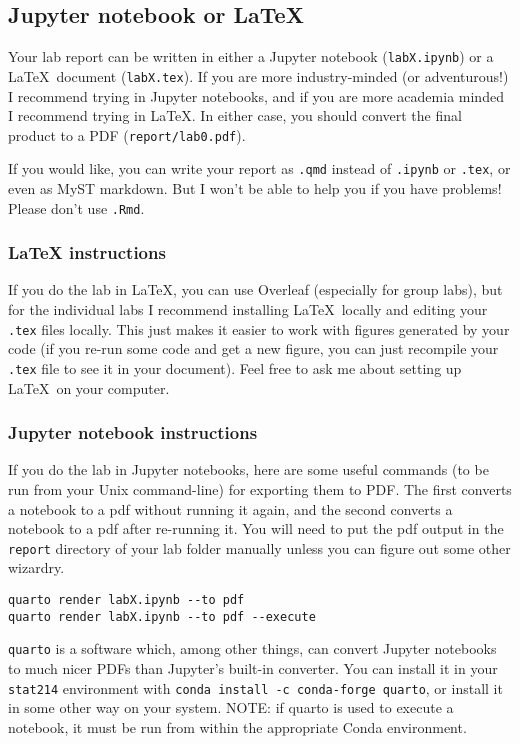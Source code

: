 \documentclass[letterpaper,12pt]{article}
\begin{document}

\subsection{Jupyter notebook or LaTeX}

Your lab report can be written in either a Jupyter notebook (\texttt{labX.ipynb}) or a \LaTeX\ document (\texttt{labX.tex}). If you are more industry-minded (or adventurous!) I recommend trying in Jupyter notebooks, and if you are more academia minded I recommend trying in \LaTeX. In either case, you should convert the final product to a PDF (\texttt{report/lab0.pdf}).

If you would like, you can write your report as \texttt{.qmd} instead of \texttt{.ipynb} or \texttt{.tex}, or even as MyST markdown. But I won't be able to help you if you have problems! Please don't use \texttt{.Rmd}.

\subsubsection{LaTeX instructions}
If you do the lab in \LaTeX, you can use Overleaf (especially for group labs), but for the individual labs I recommend installing \LaTeX\ locally and editing your \texttt{.tex} files locally. This just makes it easier to work with figures generated by your code (if you re-run some code and get a new figure, you can just recompile your \texttt{.tex} file to see it in your document). Feel free to ask me about setting up \LaTeX\ on your computer.

\subsubsection{Jupyter notebook instructions}
If you do the lab in Jupyter notebooks, here are some useful commands (to be run from your Unix command-line) for exporting them to PDF. The first converts a notebook to a pdf without running it again, and the second converts a notebook to a pdf after re-running it. You will need to put the pdf output in the \texttt{report} directory of your lab folder manually unless you can figure out some other wizardry.
\begin{verbatim}
quarto render labX.ipynb --to pdf
quarto render labX.ipynb --to pdf --execute
\end{verbatim}
\texttt{quarto} is a software which, among other things, can convert Jupyter notebooks to much nicer PDFs than Jupyter's built-in converter. You can install it in your \texttt{stat214} environment with \texttt{conda install -c conda-forge quarto}, or install it in some other way on your system. NOTE: if quarto is used to execute a notebook, it must be run from within the appropriate Conda environment.
\end{document}
